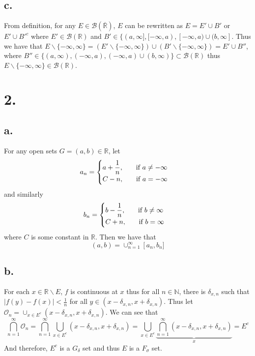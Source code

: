 \documentclass[11pt]{article}
\theoremstyle{mystyle}
\theoremstyle{definition}
\begin{document}
\subsection*{c.}
From definition, for any $E \in \mathcal{B}(\overline{\mathbb{R}})$, $E$ can be rewritten as $E = E' \cup B'$ or $E' \cup B'^c$ where $E' \in \mathcal{B}(\mathbb{R})$ and $B' \in \{(a, \infty], [-\infty, a), [-\infty, a) \cup (b, \infty]$. Thus we have that $E \backslash \{-\infty, \infty\} = (E' \backslash \{-\infty, \infty \}) \cup (B' \backslash \{-\infty, \infty \}) = E' \cup B''$, where $B'' \in \{(a, \infty), (-\infty, a), (-\infty, a) \cup (b, \infty)\} \subset \mathcal{B}(\mathbb{R})$ thus $E \backslash \{-\infty, \infty \} \in \mathcal{B}(\mathbb{R})$. 
\newpage
\section*{2.}
\subsection*{a.}
For any open sets $G = (a,b) \in \mathbb{R}$, let
\[
  a_n = 
  \begin{cases}
    a+\displaystyle\frac{1}{n}, \indent \text{ if } a \ne -\infty \\
    C-n, \indent \text{ if } a = -\infty \\
  \end{cases}
\]
and similarly
\[
  b_n = 
  \begin{cases}
    b-\displaystyle\frac{1}{n}, \indent \text{ if } b \ne \infty \\
    C+n, \indent \text{ if } b = \infty \\
  \end{cases}
\]
where $C$ is some constant in $\mathbb{R}$. Then we have that 
\[
  (a,b) = \cup_{n=1}^\infty \left[a_n, b_n]
\]
\subsection*{b.}
For each $x \in \mathbb{R} \backslash E$, $f$ is continuous at $x$ thus for all $n \in \mathbb{N}$, there is $\delta_{x, n}$ such that $\left| f(y) - f(x)\right| < \displaystyle\frac{1}{n}$ for all $y \in (x-\delta_{x,n}, x+\delta_{x,n})$. Thus let 
$\mathcal{O}_n = \cup_{x \in E^c} (x-\delta_{x,n}, x + \delta_{x,n})$. We can see that 
\[
  \bigcap_{n = 1}^\infty \mathcal{O}_n = \bigcap_{n=1}^\infty \bigcup_{x \in E^c} (x-\delta_{x,n}, x + \delta_{x,n}) = \bigcup_{x \in E^c} \underbrace{\bigcap_{n=1}^\infty (x-\delta_{x,n}, x+\delta_{x,n})}_{x} = E^c 
\]
And therefore, $E^c$ is a $G_\delta$ set and thus $E$ is a $F_\sigma$ set. 
\newpage
\end{document}
